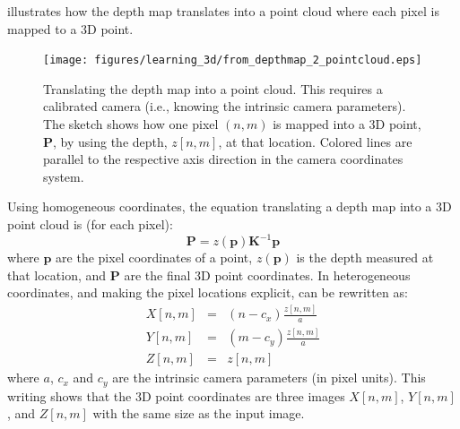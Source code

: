 
\Fig{\ref{fig:kinect2}} illustrates how the depth map translates into a point cloud where each pixel is mapped to a 3D point.



\begin{figure}[t]
\centerline{
\texttt{[image: figures/learning\_3d/from\_depthmap\_2\_pointcloud.eps]}
}
\caption{Translating the depth map into a point cloud. This requires a calibrated camera (i.e., knowing the intrinsic camera parameters). The sketch shows how one pixel $(n,m)$ is mapped into a 3D point, $\mathbf{P}$, by using the depth, $z[n,m]$, at that location. Colored lines are parallel to the respective axis direction in the camera coordinates system.}
\label{fig:kinect2}
\end{figure}

Using homogeneous coordinates, the equation translating a depth map into a 3D point cloud is (for each pixel):
\begin{equation}
\mathbf{P} = z(\mathbf{p}) \mathbf{K}^{-1} \mathbf{p}
\label{eq:3dcloudpointfromz}
\end{equation}
where $\mathbf{p}$ are the pixel coordinates of a point, $z(\mathbf{p})$ is the depth measured at that location, and $\mathbf{P}$ are the final 3D point coordinates. 
In heterogeneous coordinates, and making the pixel locations explicit, \eqn{\ref{eq:3dcloudpointfromz}} can be rewritten as:
\begin{eqnarray}
    X[n,m] &=& \left( n-c_x \right) \frac{z[n,m]}{a} \nonumber \\
    Y[n,m] &=& \left( m-c_y \right) \frac{z[n,m]}{a} \nonumber \\
    Z[n,m] &=& z[n,m] 
\end{eqnarray}
where $a$, $c_x$ and $c_y$ are the intrinsic camera parameters (in pixel units). This writing shows that the 3D point coordinates are three images $X[n,m]$, $Y[n,m]$, and $Z[n,m]$ with the same size as the input image. 


